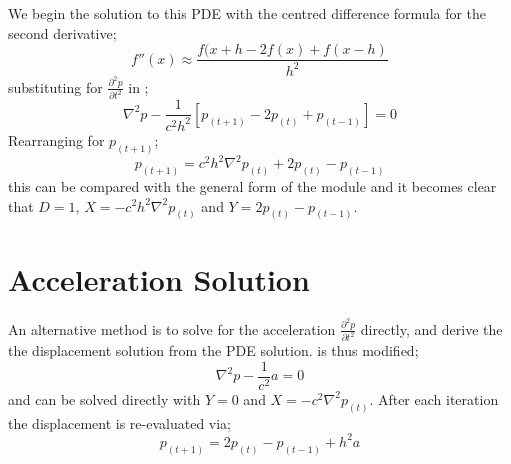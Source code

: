 We begin the solution to this PDE with the centred difference formula for the
second derivative;
\begin{equation}
 f''(x) \approx \frac{f(x+h - 2f(x) + f(x-h)}{h^2}
\label{eqn:centdiff}
\end{equation}
substituting  for $\frac{\partial ^2 p }{\partial t ^2}$
in ;
\begin{equation}
 \nabla ^2 p - \frac{1}{c^2h^2} \left[p_{(t+1)} - 2p_{(t)} + p_{(t-1)} \right]
= 0
\label{eqn:waveu}
\end{equation}
Rearranging for $p_{(t+1)}$;
\begin{equation}
 p_{(t+1)} = c^2 h^2 \nabla ^2 p_{(t)} +2p_{(t)} - p_{(t-1)}
\end{equation}
this can be compared with the general form of the \modLPDE module and it
becomes clear that $D=1$, $X=-c^2 h^2 \nabla ^2 p_{(t)}$ and $Y=2p_{(t)} -
p_{(t-1)}$.

\section{Acceleration Solution}

An alternative method is to solve for the acceleration $\frac{\partial ^2
p}{\partial t^2}$ directly, and derive the the displacement solution from the
PDE solution.  is thus modified;
\begin{equation}
  \nabla ^2 p - \frac{1}{c^2} a = 0
\label{eqn:wavea}
\end{equation}
and can be solved directly with $Y=0$ and $X=-c^2 \nabla ^2 p_{(t)}$.
After each iteration the displacement is re-evaluated via;
\begin{equation}
 p_{(t+1)}=2p_{(t)} - p_{(t-1)} + h^2a
\end{equation}


